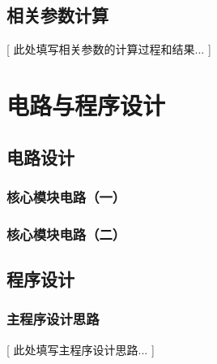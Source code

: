 \documentclass[UTF-8,zihao=-4]{ctexart}
\begin{document}
\subsection{相关参数计算}
    [ 此处填写相关参数的计算过程和结果... ]
    
\section{电路与程序设计}
\subsection{电路设计}
\subsubsection{核心模块电路（一）}
    
\subsubsection{核心模块电路（二）}

\subsection{程序设计}
\subsubsection{主程序设计思路}
    [ 此处填写主程序设计思路... ]
\end{document}
